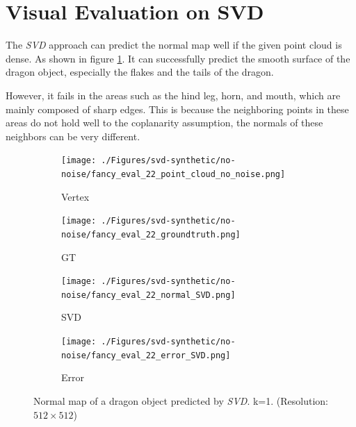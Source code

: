 \section{Visual Evaluation on SVD}

The \textit{SVD} approach can predict the normal map well if the given point cloud is dense. As shown in figure \ref{fig:svd-normal}. It can successfully predict the smooth surface of the dragon object, especially the flakes and the tails of the dragon. 

However, it fails in the areas such as the hind leg, horn, and mouth, which are mainly composed of sharp edges. This is because the neighboring points in these areas do not hold well to the coplanarity assumption, the normals of these neighbors can be very different. 



\begin{figure}[th]
	\centering
	\captionsetup{width=\linewidth}
		\begin{subfigure}[b]{0.24\linewidth}
		\texttt{[image: ./Figures/svd-synthetic/no-noise/fancy\_eval\_22\_point\_cloud\_no\_noise.png]}
		\caption{Vertex}
	\end{subfigure}
	\begin{subfigure}[b]{0.24\linewidth}
		\texttt{[image: ./Figures/svd-synthetic/no-noise/fancy\_eval\_22\_groundtruth.png]}
		\caption{GT}
	\end{subfigure}
	\begin{subfigure}[b]{0.24\linewidth}
		\texttt{[image: ./Figures/svd-synthetic/no-noise/fancy\_eval\_22\_normal\_SVD.png]}
		\caption{SVD}
	\end{subfigure}
	\begin{subfigure}[b]{0.24\linewidth}
		\texttt{[image: ./Figures/svd-synthetic/no-noise/fancy\_eval\_22\_error\_SVD.png]}
		\caption{Error}
	\end{subfigure}
	
	\decoRule
	\caption{Normal map of a dragon object predicted by \textit{SVD}. k=1. (Resolution: $ 512\times 512 $) }
	\label{fig:svd-normal}
\end{figure}

